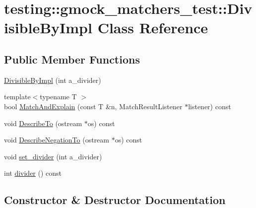 \hypertarget{classtesting_1_1gmock__matchers__test_1_1DivisibleByImpl}{}\section{testing\+::gmock\+\_\+matchers\+\_\+test\+::Divisible\+By\+Impl Class Reference}
\label{classtesting_1_1gmock__matchers__test_1_1DivisibleByImpl}
\subsection*{Public Member Functions}
\begin{DoxyCompactItemize}
\item 
\mbox{\hyperlink{classtesting_1_1gmock__matchers__test_1_1DivisibleByImpl_aab5d8d383a8cbf112fe087c4f0f3f699}{Divisible\+By\+Impl}} (int a\+\_\+divider)
\item 
{\footnotesize template$<$typename T $>$ }\\bool \mbox{\hyperlink{classtesting_1_1gmock__matchers__test_1_1DivisibleByImpl_a2621df4b34315b327e20b6f4d901417d}{Match\+And\+Explain}} (const T \&n, Match\+Result\+Listener $\ast$listener) const
\item 
void \mbox{\hyperlink{classtesting_1_1gmock__matchers__test_1_1DivisibleByImpl_aabd14d5f96ef6851141d9ed9fbee3f86}{Describe\+To}} (ostream $\ast$os) const
\item 
void \mbox{\hyperlink{classtesting_1_1gmock__matchers__test_1_1DivisibleByImpl_a9c061ef411c126c604d4c33d92911d50}{Describe\+Negation\+To}} (ostream $\ast$os) const
\item 
void \mbox{\hyperlink{classtesting_1_1gmock__matchers__test_1_1DivisibleByImpl_a86c8787ab835bc84a9ad7e3931d644cc}{set\+\_\+divider}} (int a\+\_\+divider)
\item 
int \mbox{\hyperlink{classtesting_1_1gmock__matchers__test_1_1DivisibleByImpl_afaf102bc25623966dd11805b62e42321}{divider}} () const
\end{DoxyCompactItemize}


\subsection{Constructor \& Destructor Documentation}
\mbox{\label{classtesting_1_1gmock__matchers__test_1_1DivisibleByImpl_aab5d8d383a8cbf112fe087c4f0f3f699}} 
